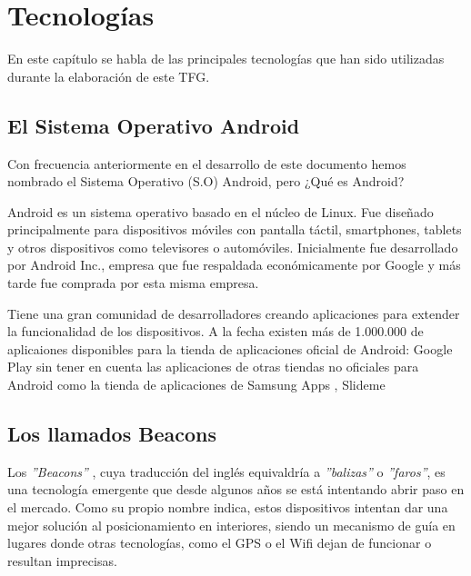 %
%
%

\cleardoublepage
\chapter{Tecnologías} \label{chap:polytopes} %

En este capítulo se habla de las principales tecnologías que han sido utilizadas durante la elaboración de este TFG.


\section{El Sistema Operativo Android}

Con frecuencia anteriormente en el desarrollo de este documento hemos nombrado el Sistema Operativo (S.O) Android, pero ¿Qué es Android?

Android es un sistema operativo basado en el núcleo de Linux. Fue diseñado principalmente para dispositivos móviles con pantalla táctil, smartphones, tablets y otros dispositivos como televisores o automóviles. Inicialmente fue desarrollado por Android Inc., empresa que fue respaldada económicamente por Google y más tarde fue comprada por esta misma empresa.


Tiene una gran comunidad de desarrolladores creando aplicaciones para extender la funcionalidad de los dispositivos. A la fecha existen más de 1.000.000 de aplicaiones disponibles para la tienda de aplicaciones oficial de Android: Google Play \cite{URL::GooglePlay} sin tener en cuenta las aplicaciones de otras tiendas no oficiales para Android como la tienda de aplicaciones de Samsung Apps \cite{URL::SamsungApps}, Slideme 

\section{Los llamados Beacons}

Los \textit{''Beacons''} \cite{URL::Beacon}, cuya traducción del inglés equivaldría a \textit{''balizas''} o \textit{''faros''}, es una tecnología emergente que desde algunos años se está intentando abrir paso en el mercado. Como su propio nombre indica, estos dispositivos intentan dar una mejor solución al posicionamiento en interiores, siendo un mecanismo de guía en lugares donde otras tecnologías, como el GPS o el Wifi dejan de funcionar o resultan imprecisas. 


